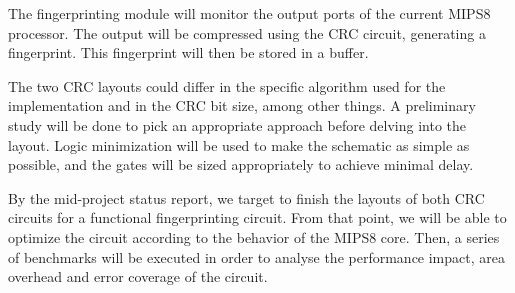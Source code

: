 \documentclass[dvips,12pt]{article}
\begin{document}
The fingerprinting module will monitor the output ports of the current MIPS8 processor. 
The output will be compressed using the CRC circuit, generating a fingerprint. This fingerprint will then be
stored in a buffer.

The two CRC layouts could differ in the specific algorithm used for the implementation and in the CRC bit size, among other things.
A preliminary study will be done to pick an appropriate approach before delving into the layout. 
Logic minimization will be used to make the schematic as simple as possible, and the gates will be sized appropriately to achieve minimal delay.

By the mid-project status report, we target to finish the layouts of both CRC circuits for a functional
fingerprinting circuit. From that point, we will be able to optimize the circuit according to the behavior
of the MIPS8 core. Then, a series of benchmarks will be executed in order to analyse the performance
impact, area overhead and error coverage of the circuit.
\end{document}
